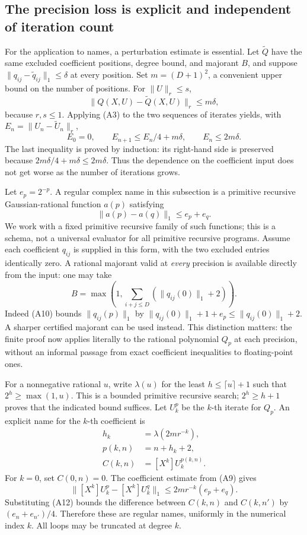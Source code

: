 \subsection{The precision loss is explicit and independent of iteration count}

For the application to names, a perturbation estimate is essential.
Let \(\widetilde Q\) have the same excluded coefficient positions,
degree bound, and majorant \(B\), and suppose
\(\lVert q_{ij}-\widetilde q_{ij}\rVert_1\leq\delta\) at every
position. Set \(m=(D+1)^2\), a convenient upper bound on the number
of positions. For \(\lVert U\rVert_r\leq s\),
\[
 \lVert Q(X,U)-\widetilde Q(X,U)\rVert_r\leq m\delta,
 \tag{A8}\label{eq:coefficient-perturbation}
\]
because \(r,s\leq1\). Applying (A3) to the two sequences of
iterates yields, with \(E_n=\lVert U_n-\widetilde U_n\rVert_r\),
\[
 E_0=0,\qquad E_{n+1}\leq E_n/4+m\delta,
 \qquad E_n\leq2m\delta.
 \tag{A9}\label{eq:iterate-perturbation}
\]
The last inequality is proved by induction: its right-hand side is
preserved because \(2m\delta/4+m\delta\leq2m\delta\).
Thus the dependence on the coefficient input does not get worse as the
number of iterations grows.

Let \(e_p=2^{-p}\). A regular complex name in this subsection is a
primitive recursive Gaussian-rational function \(a(p)\) satisfying
\[
 \lVert a(p)-a(q)\rVert_1\leq e_p+e_q.
 \tag{A10}\label{eq:branch-name}
\]
We work with a fixed primitive recursive family of such functions; this
is a schema, not a universal evaluator for all primitive recursive
programs. Assume each coefficient \(q_{ij}\) is supplied in this form,
with the two excluded entries identically zero. A rational majorant
valid at \emph{every} precision is available directly from the input:
one may take
\[
 B=\max\left(1,\sum_{i+j\leq D}
                 (\lVert q_{ij}(0)\rVert_1+2)\right).
 \tag{A11}\label{eq:uniform-majorant}
\]
Indeed (A10) bounds \(\lVert q_{ij}(p)\rVert_1\) by
\(\lVert q_{ij}(0)\rVert_1+1+e_p\leq\lVert q_{ij}(0)\rVert_1+2\).
A sharper certified majorant can be used instead. This distinction
matters: the finite proof now applies literally to the rational
polynomial \(Q_p\) at each precision, without an informal passage from
exact coefficient inequalities to floating-point ones.

For a nonnegative rational \(u\), write \(\lambda(u)\) for the least
\(h\leq\lceil u\rceil+1\) such that
\(2^h\geq\max(1,u)\). This is a bounded primitive recursive search;
\(2^h\geq h+1\) proves that the indicated bound suffices. Let
\(U_k^p\) be the \(k\)-th iterate for \(Q_p\). An explicit name for
the \(k\)-th coefficient is
\[
 \begin{split}
 h_k&=\lambda(2m r^{-k}),\\
 p(k,n)&=n+h_k+2,\\
 C(k,n)&=[X^k]U_k^{p(k,n)}.
 \end{split}
 \tag{A12}\label{eq:coefficient-name}
\]
For \(k=0\), set \(C(0,n)=0\). The coefficient estimate from
(A9) gives
\[
 \lVert [X^k]U_k^p-[X^k]U_k^q\rVert_1
 \leq2m r^{-k}(e_p+e_q).
\]
Substituting (A12) bounds the difference between \(C(k,n)\) and
\(C(k,n')\) by \((e_n+e_{n'})/4\). Therefore these are regular
names, uniformly in the numerical index \(k\). All loops may be
truncated at degree \(k\).

